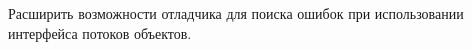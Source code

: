 \begin{frame}
	\frametitle{\insertsection} 
	\framesubtitle{\insertsubsection}
	Расширить возможности отладчика для поиска ошибок при использовании интерфейса потоков объектов.
\end{frame}
